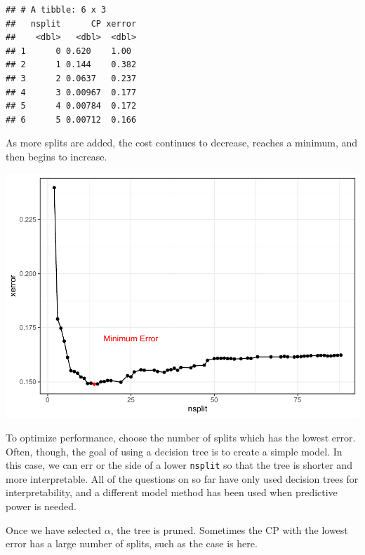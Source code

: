 \documentclass[openany]{book}
\newenvironment{Shaded}{\begin{snugshade}}{\end{snugshade}}
\newcommand{\KeywordTok}[1]{\textcolor[rgb]{0.13,0.29,0.53}{\textbf{#1}}}
\newcommand{\NormalTok}[1]{#1}
\newcommand{\OperatorTok}[1]{\textcolor[rgb]{0.81,0.36,0.00}{\textbf{#1}}}
\newcommand{\StringTok}[1]{\textcolor[rgb]{0.31,0.60,0.02}{#1}}
\begin{document}
\begin{verbatim}
## # A tibble: 6 x 3
##   nsplit      CP xerror
##    <dbl>   <dbl>  <dbl>
## 1      0 0.620    1.00 
## 2      1 0.144    0.382
## 3      2 0.0637   0.237
## 4      3 0.00967  0.177
## 5      4 0.00784  0.172
## 6      5 0.00712  0.166
\end{verbatim}

As more splits are added, the cost continues to decrease, reaches a minimum, and then begins to increase.

\includegraphics{06-tree-based-models_files/figure-latex/unnamed-chunk-6-1.pdf}

To optimize performance, choose the number of splits which has the lowest error. Often, though, the goal of using a decision tree is to create a simple model. In this case, we can err or the side of a lower \texttt{nsplit} so that the tree is shorter and more interpretable. All of the questions on so far have only used decision trees for interpretability, and a different model method has been used when predictive power is needed.

Once we have selected \(\alpha\), the tree is pruned. Sometimes the CP with the lowest error has a large number of splits, such as the case is here.

\begin{Shaded}
\end{Shaded}
\end{document}
